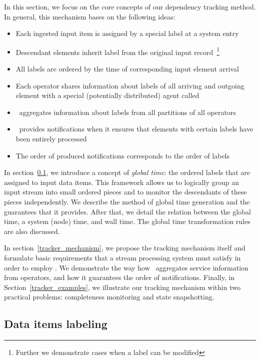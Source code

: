 \label{fs-acker-design}

In this section, we focus on the core concepts of our dependency tracking method. In general, this mechanism bases on the following ideas:
\begin{itemize}
    \item Each ingested input item is assigned by a special label at a system entry
    \item Descendant elements inherit label from the original input record~\footnote{Further we demonstrate cases when a label can be modified}
    \item All labels are ordered by the time of corresponding input element arrival 
    \item Each operator shares information about labels of all arriving and outgoing element with a special (potentially distributed) agent called {\em \tracker}
    \item \tracker\ aggregates information about labels from all partitions of all operators
    \item \tracker\ provides notifications when it ensures that elements with certain labels have been entirely processed
    \item The order of produced notifications corresponds to the order of labels
\end{itemize}

In section~\ref{labeling}, we introduce a concept of {\em global time}: the ordered labels that are assigned to input data items. This framework allows us to logically group an input stream into small ordered pieces and to monitor the descendants of these pieces independently. We describe the method of global time generation and the guarantees that it provides. After that, we detail the relation between the global time, a system (node) time, and wall time. The global time transformation rules are also discussed.

In section~\ref{tracker_mechanism}, we propose the tracking mechanism itself and formulate basic requirements that a stream processing system must satisfy in order to employ \tracker . We demonstrate the way how \tracker\ aggregates service information from operators, and how it guarantees the order of notifications. Finally, in Section~\ref{tracker_examples}, we illustrate our tracking mechanism within two practical problems: completeness monitoring and state snapshotting.

\subsection{Data items labeling} \label{labeling}

